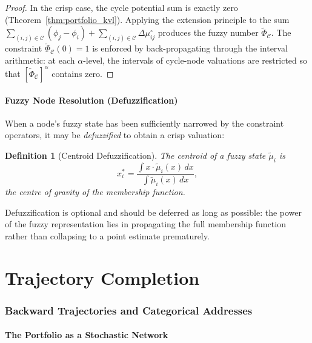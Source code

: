 \documentclass[twocolumn,10pt]{article}
\newtheorem{definition}[theorem]{Definition}
\theoremstyle{remark}
\newcommand{\fuzzyset}[1]{\tilde{\mu}_{#1}}
\newcommand{\thmref}[1]{Theorem~\ref{#1}}
\begin{document}
\begin{proof}
In the crisp case, the cycle potential sum is exactly zero (\thmref{thm:portfolio_kvl}).  Applying the extension principle to the sum $\sum_{(i,j) \in \mathcal{C}} (\phi_j - \phi_i) + \sum_{(i,j) \in \mathcal{C}} \Delta\mu_{ij}^\circ$ produces the fuzzy number $\tilde{\Phi}_\mathcal{C}$.  The constraint $\tilde{\Phi}_\mathcal{C}(0) = 1$ is enforced by back-propagating through the interval arithmetic: at each $\alpha$-level, the intervals of cycle-node valuations are restricted so that $[\tilde{\Phi}_\mathcal{C}]^\alpha$ contains zero.
\end{proof}

\subsection{Fuzzy Node Resolution (Defuzzification)}

When a node's fuzzy state has been sufficiently narrowed by the constraint operators, it may be \emph{defuzzified} to obtain a crisp valuation:

\begin{definition}[Centroid Defuzzification]
\label{def:defuzzify}
The \emph{centroid} of a fuzzy state $\fuzzyset{i}$ is
\begin{equation}
    x_i^* = \frac{\int x \cdot \fuzzyset{i}(x) \, dx}{\int \fuzzyset{i}(x) \, dx},
    \label{eq:centroid}
\end{equation}
the centre of gravity of the membership function.
\end{definition}

Defuzzification is optional and should be deferred as long as possible: the power of the fuzzy representation lies in propagating the full membership function rather than collapsing to a point estimate prematurely.

\part{Trajectory Completion}

\section{Backward Trajectories and Categorical Addresses}
\label{sec:backward_traj}

\subsection{The Portfolio as a Stochastic Network}
\end{document}
